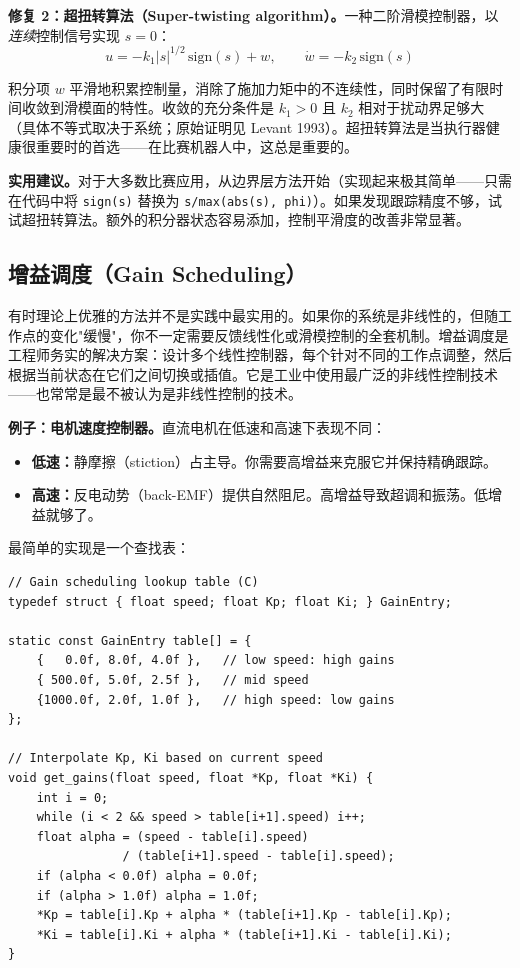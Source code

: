 \textbf{修复 2：超扭转算法（Super-twisting algorithm）。}一种二阶滑模控制器，以\textit{连续}控制信号实现 $s = 0$：
\begin{equation}
u = -k_1 |s|^{1/2}\,\mathrm{sign}(s) + w, \qquad \dot{w} = -k_2\,\mathrm{sign}(s)
\end{equation}

积分项 $w$ 平滑地积累控制量，消除了施加力矩中的不连续性，同时保留了有限时间收敛到滑模面的特性。收敛的充分条件是 $k_1 > 0$ 且 $k_2$ 相对于扰动界足够大（具体不等式取决于系统；原始证明见 Levant 1993）。超扭转算法是当执行器健康很重要时的首选——在比赛机器人中，这总是重要的。

\textbf{实用建议。}对于大多数比赛应用，从边界层方法开始（实现起来极其简单——只需在代码中将 \texttt{sign(s)} 替换为 \texttt{s/max(abs(s), phi)}）。如果发现跟踪精度不够，试试超扭转算法。额外的积分器状态容易添加，控制平滑度的改善非常显著。

\subsection{增益调度（Gain Scheduling）}

有时理论上优雅的方法并不是实践中最实用的。如果你的系统是非线性的，但随工作点的变化"缓慢"，你不一定需要反馈线性化或滑模控制的全套机制。增益调度是工程师务实的解决方案：设计多个线性控制器，每个针对不同的工作点调整，然后根据当前状态在它们之间切换或插值。它是工业中使用最广泛的非线性控制技术——也常常是最不被认为是非线性控制的技术。

\textbf{例子：电机速度控制器。}直流电机在低速和高速下表现不同：
\begin{itemize}[nosep]
    \item \textbf{低速：}静摩擦（stiction）占主导。你需要高增益来克服它并保持精确跟踪。
    \item \textbf{高速：}反电动势（back-EMF）提供自然阻尼。高增益导致超调和振荡。低增益就够了。
\end{itemize}

最简单的实现是一个查找表：

\begin{verbatim}
// Gain scheduling lookup table (C)
typedef struct { float speed; float Kp; float Ki; } GainEntry;

static const GainEntry table[] = {
    {   0.0f, 8.0f, 4.0f },   // low speed: high gains
    { 500.0f, 5.0f, 2.5f },   // mid speed
    {1000.0f, 2.0f, 1.0f },   // high speed: low gains
};

// Interpolate Kp, Ki based on current speed
void get_gains(float speed, float *Kp, float *Ki) {
    int i = 0;
    while (i < 2 && speed > table[i+1].speed) i++;
    float alpha = (speed - table[i].speed)
                / (table[i+1].speed - table[i].speed);
    if (alpha < 0.0f) alpha = 0.0f;
    if (alpha > 1.0f) alpha = 1.0f;
    *Kp = table[i].Kp + alpha * (table[i+1].Kp - table[i].Kp);
    *Ki = table[i].Ki + alpha * (table[i+1].Ki - table[i].Ki);
}
\end{verbatim}

